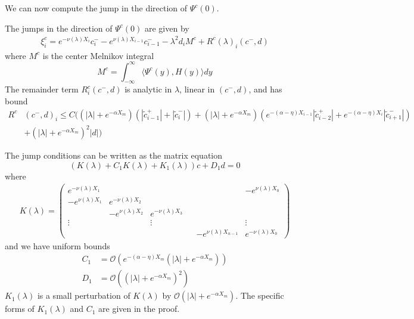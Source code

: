 \documentclass[thesis.tex]{subfiles}
\begin{document}
We can now compute the jump in the direction of $\Psi^c(0)$.

\begin{lemma}\label{jumpcenteradj}
The jumps in the direction of $\Psi^c(0)$ are given by
\begin{align}\label{xic}
\xi^c_i = e^{-\nu(\lambda) X_i} c_i^- - e^{\nu(\lambda) X_{i-1}} c_{i-1}^- - \lambda^2 d_i M^c + R^c(\lambda)_i(c^-, d)
\end{align}
where $M^c$ is the center Melnikov integral
\begin{equation}\label{Mc}
M^c =  \int_{-\infty}^\infty \langle \Psi^c(y), H(y) \rangle dy 
\end{equation}
The remainder term $R^c_i(c^-, d)$ is analytic in $\lambda$, linear in $(c^-, d)$, and has bound
\begin{align*}
R^c&(c^-, d)_i \leq C \Big(
(|\lambda| + e^{-\alpha X_m})(|\tilde{c}_{i-1}^+| + |\tilde{c}_{i}^-|) + (|\lambda| + e^{-\alpha X_m})(  e^{-(\alpha - \eta) X_{i-1} } |\tilde{c}_{i-2}^+| + e^{-(\alpha - \eta) X_i } |\tilde{c}_{i+1}^-|)  \\
&+ (|\lambda| + e^{-\alpha X_m})^2 |d|
\Big)
\end{align*}

The jump conditions can be written as the matrix equation
\begin{equation}\label{matrixjumpc}
(K(\lambda) + C_1 K(\lambda) + K_1(\lambda)) c + D_1 d = 0
\end{equation}
where
\begin{align*}
K(\lambda) =  
\begin{pmatrix}
e^{-\nu(\lambda)X_1} & & & & & -e^{\nu(\lambda)X_0} \\
-e^{\nu(\lambda)X_1} & e^{-\nu(\lambda)X_2} \\
& -e^{\nu(\lambda)X_2} & e^{-\nu(\lambda)X_3} \\
\vdots & & \vdots & &&  \vdots \\
& & & & -e^{\nu(\lambda)X_{n-1}} & e^{-\nu(\lambda)X_0} 
\end{pmatrix}
\end{align*}
and we have uniform bounds
\begin{align*}
C_1 &= \mathcal{O}(e^{-(\alpha - \eta) X_m}(|\lambda| + e^{-\alpha X_m})) \\
D_1 &= \mathcal{O}((|\lambda| + e^{-\alpha X_m})^2)
\end{align*}
$K_1(\lambda)$ is a small perturbation of $K(\lambda)$ by $\mathcal{O}(|\lambda| + e^{-\alpha X_m})$. The specific forms of $K_1(\lambda)$ and $C_1$ are given in the proof.


\end{lemma}
\end{document}

